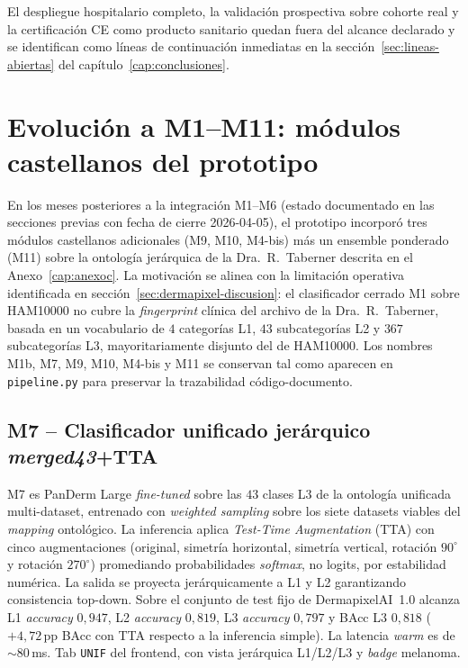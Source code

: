 El despliegue hospitalario completo, la validación prospectiva
sobre cohorte real y la certificación CE como producto sanitario
quedan fuera del alcance declarado y se identifican como líneas
de continuación inmediatas en la sección~\ref{sec:lineas-abiertas} del
capítulo~\ref{cap:conclusiones}.

\section{Evolución a M1--M11: módulos castellanos del prototipo}
\label{sec:dermapixel-m11}

En los meses posteriores a la integración M1--M6 (estado
documentado en las secciones previas con fecha de cierre
2026-04-05), el prototipo incorporó tres módulos castellanos
adicionales (M9, M10, M4-bis) más un ensemble ponderado (M11)
sobre la ontología jerárquica de la Dra.~R.~Taberner descrita en
el Anexo~\ref{cap:anexoc}. La motivación se alinea con la
limitación operativa identificada en
sección~\ref{sec:dermapixel-discusion}: el clasificador cerrado
M1 sobre HAM10000 no cubre la \emph{fingerprint} clínica del
archivo de la Dra.~R.~Taberner, basada en un vocabulario de
$4$ categorías L1, $43$ subcategorías L2 y $367$ subcategorías
L3, mayoritariamente disjunto del de HAM10000. Los nombres M1b,
M7, M9, M10, M4-bis y M11 se conservan tal como aparecen en
\texttt{pipeline.py} para preservar la trazabilidad
código-documento.

\subsection{M7 -- Clasificador unificado jerárquico
\emph{merged43}+TTA}
\label{sec:dermapixel-m7}

M7 es PanDerm Large \emph{fine-tuned} sobre las $43$ clases L3 de
la ontología unificada multi-dataset, entrenado con
\emph{weighted sampling} sobre los siete datasets viables del
\emph{mapping} ontológico. La inferencia aplica \emph{Test-Time
Augmentation} (TTA) con cinco augmentaciones (original, simetría
horizontal, simetría vertical, rotación $90^\circ$ y rotación
$270^\circ$) promediando probabilidades \emph{softmax}, no
logits, por estabilidad numérica. La salida se proyecta
jerárquicamente a L1 y L2 garantizando consistencia top-down.
Sobre el conjunto de test fijo de DermapixelAI~1.0 alcanza
L1 \emph{accuracy} $0{,}947$, L2 \emph{accuracy} $0{,}819$,
L3 \emph{accuracy} $0{,}797$ y BAcc L3 $0{,}818$
($+4{,}72$\,pp BAcc con TTA respecto a la inferencia simple).
La latencia \emph{warm} es de $\sim 80$\,ms. Tab \texttt{UNIF}
del frontend, con vista jerárquica L1/L2/L3 y \emph{badge}
melanoma.

